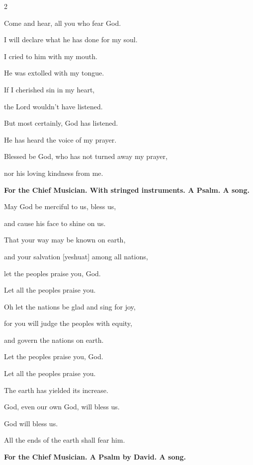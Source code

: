 \begin{multicols}{2}
	
	\myverse{}Come and hear, all you who fear God.
	
	I will declare what he has done for my soul.
	
	
	\myverse{}I cried to him with my mouth.
	
	He was extolled with my tongue.
	
	
	\myverse{}If I cherished sin in my heart,
	
	the Lord wouldn’t have listened.
	
	
	\myverse{}But most certainly, God has listened.
	
	He has heard the voice of my prayer.
	
	
	\myverse{}Blessed be God, who has not turned away my prayer,
	
	nor his loving kindness from me.
	
	
	\mychapter{}\textbf{For the Chief Musician. With stringed instruments. A Psalm. A song.}
	
	\myverse*{}May God be merciful to us, bless us,
	
	and cause his face to shine on us.
	
	\vspace{\baselineskip}	
	
	\myverse{}That your way may be known on earth,
	
	and your salvation [yeshuat] among all nations,
	
	
	\myverse{}let the peoples praise you, God.
	
	Let all the peoples praise you.
	
	
	\myverse{}Oh let the nations be glad and sing for joy,
	
	for you will judge the peoples with equity,
	
	and govern the nations on earth.
	
	\vspace{\baselineskip}	
	
	\myverse{}Let the peoples praise you, God.
	
	Let all the peoples praise you.
	
	
	\myverse{}The earth has yielded its increase.
	
	God, even our own God, will bless us.
	
	
	\myverse{}God will bless us.
	
	All the ends of the earth shall fear him.
	
	
	\mychapter{}\textbf{For the Chief Musician. A Psalm by David. A song.}
	

\end{multicols}
